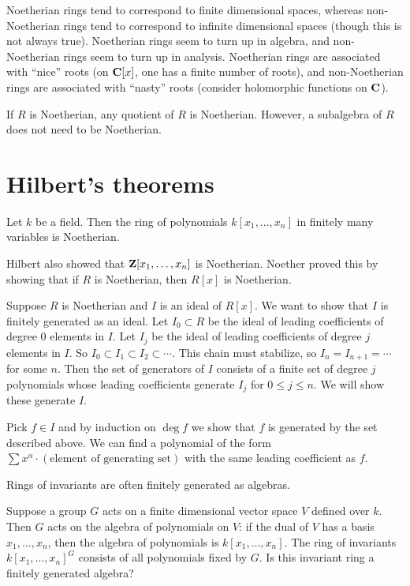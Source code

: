 \documentclass[11pt, oneside,margin=1in]{article}
\begin{document}
Noetherian rings tend to correspond to finite dimensional spaces, whereas non-Noetherian rings tend to correspond to infinite dimensional spaces (though this is not always true). Noetherian rings seem to turn up in algebra, and non-Noetherian rings seem to turn up in analysis. Noetherian rings are associated with ``nice'' roots (on $\mathbf C[x]$, one has a finite number of roots), and non-Noetherian rings are associated with ``nasty'' roots (consider holomorphic functions on $\mathbf C$). 

If $R$ is Noetherian, any quotient of $R$ is Noetherian. However, a subalgebra of $R$ does not need to be Noetherian.

\section{Hilbert's theorems}
\begin{theorem}[Hilbert]\label{}
Let $k$ be a field. Then the ring of polynomials $k[x_1,\hdots,x_n]$ in finitely many variables is Noetherian.
\end{theorem}

Hilbert also showed that $\mathbf Z[x_1,\hdots, x_n]$ is Noetherian. Noether proved this by showing that if $R$ is Noetherian, then $R[x]$ is Noetherian.

Suppose $R$ is Noetherian and $I$ is an ideal of $R[x]$. We want to show that $I$ is finitely generated as an ideal. Let $I_0\subset R$ be the ideal of leading coefficients of degree 0 elements in $I$. Let $I_j$ be the ideal of leading coefficients of degree $j$ elements in $I$. So $I_0 \subset I_1 \subset I_2\subset \cdots$. This chain must stabilize, so $I_n = I_{n+1} = \cdots$ for some $n$. Then the set of generators of $I$ consists of a finite set of degree $j$ polynomials whose leading coefficients generate $I_j$ for $0\le j\le n$. We will show these generate $I$.

Pick $f\in I$ and by induction on $\deg f$ we show that $f$ is generated by the set described above. We can find a polynomial of the form $\sum x^\alpha\cdot (\textrm{element of generating set}) $ with the same leading coefficient as $f$.

\begin{theorem}\label{}\index{}
Rings of invariants are often finitely generated as algebras.
\end{theorem}

Suppose a group $G$ acts on a finite dimensional vector space $V$ defined over $k$. Then $G$ acts on the algebra of polynomials on $V$: if the dual of $V$ has a basis $x_1,\hdots, x_n$, then the algebra of polynomials is $k[x_1,\hdots,x_n]$. The ring of invariants $k[x_1,\hdots,x_n]^G$ consists of all polynomials fixed by $G$. Is this invariant ring a finitely generated algebra?
\end{document}
